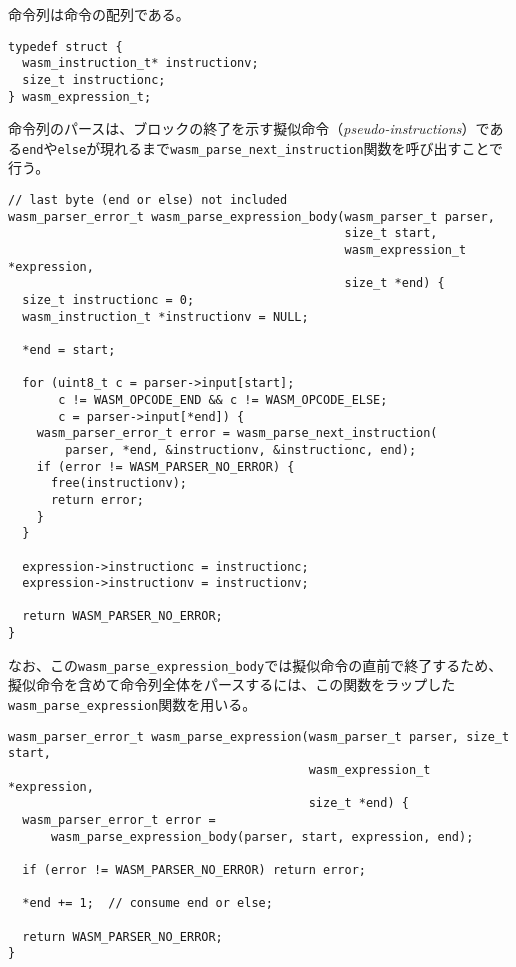 命令列は命令の配列である。

\begin{lstlisting}[caption=命令列を表現する構造体の定義,label=lst:argument_t]
typedef struct {
  wasm_instruction_t* instructionv;
  size_t instructionc;
} wasm_expression_t;
\end{lstlisting}

命令列のパースは、ブロックの終了を示す擬似命令（{\it pseudo-instructions}）である\verb|end|や\verb|else|が現れるまで\verb|wasm_parse_next_instruction|関数を呼び出すことで行う。

\begin{lstlisting}[caption=命令列のパース,label=lst:argument_t]
// last byte (end or else) not included
wasm_parser_error_t wasm_parse_expression_body(wasm_parser_t parser,
                                               size_t start,
                                               wasm_expression_t *expression,
                                               size_t *end) {
  size_t instructionc = 0;
  wasm_instruction_t *instructionv = NULL;

  *end = start;

  for (uint8_t c = parser->input[start];
       c != WASM_OPCODE_END && c != WASM_OPCODE_ELSE;
       c = parser->input[*end]) {
    wasm_parser_error_t error = wasm_parse_next_instruction(
        parser, *end, &instructionv, &instructionc, end);
    if (error != WASM_PARSER_NO_ERROR) {
      free(instructionv);
      return error;
    }
  }

  expression->instructionc = instructionc;
  expression->instructionv = instructionv;

  return WASM_PARSER_NO_ERROR;
}
\end{lstlisting}

なお、この\verb|wasm_parse_expression_body|では擬似命令の直前で終了するため、擬似命令を含めて命令列全体をパースするには、この関数をラップした\verb|wasm_parse_expression|関数を用いる。

\begin{lstlisting}[caption=命令列のパース,label=lst:argument_t]
wasm_parser_error_t wasm_parse_expression(wasm_parser_t parser, size_t start,
                                          wasm_expression_t *expression,
                                          size_t *end) {
  wasm_parser_error_t error =
      wasm_parse_expression_body(parser, start, expression, end);

  if (error != WASM_PARSER_NO_ERROR) return error;

  *end += 1;  // consume end or else;

  return WASM_PARSER_NO_ERROR;
}
\end{lstlisting}


